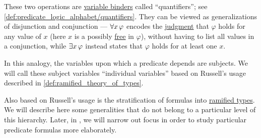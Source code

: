 \begin{remark}
  These two operations are \hyperref[con:variable_binding]{variable binders} called \enquote{quantifiers}; see \cref{def:predicate_logic_alphabet/quantifiers}. They can be viewed as generalizations of disjunction and conjunction --- \( \qforall* x \varphi \) encodes the \hyperref[con:judgment]{judgment} that \( \varphi \) holds for any value of \( x \) (here \( x \) is a possibly \hyperref[con:variable_binding]{free} in \( \varphi \)), without having to list all values in a conjunction, while \( \qexists* x \varphi \) instead states that \( \varphi \) holds for at least one \( x \).

  In this analogy, the variables upon which a predicate depends are subjects. We will call these subject variables \enquote{individual variables} based on Russell's usage described in \cref{def:ramified_theory_of_types}.

  Also based on Russell's usage is the stratification of formulas into \hyperref[def:ramified_theory_of_types/ramified_type]{ramified types}. We will describe here some generalities that do not belong to a particular level of this hierarchy. Later, in , we will narrow out focus in order to study particular predicate formulas more elaborately.
\end{remark}


